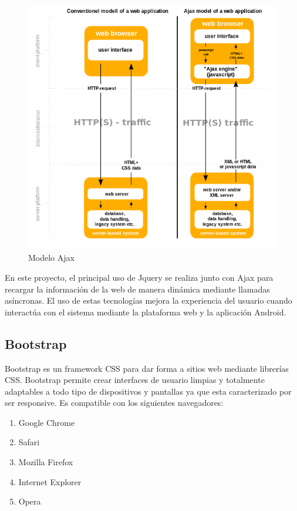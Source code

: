 \documentclass[a4paper,11pt]{book}
\begin{document}
\begin{figure}[H] 
\centering 
\includegraphics[scale=0.35]{imagenes/desarrollo_herramienta/ajax.png}
\caption{ Modelo Ajax\cite{aj2}  }  
\end{figure}   

En este proyecto, el principal uso de Jquery se realiza junto con Ajax para recargar la información de la web de manera dinámica mediante llamadas asíncronas. El uso de estas tecnologías mejora la experiencia del usuario cuando interactúa con el sistema mediante la plataforma web y la aplicación Android.


\subsection{Bootstrap}
Bootstrap\cite{boo} es un framework CSS para dar forma a sitios web mediante librerías CSS. Bootstrap  permite crear interfaces de usuario limpias y totalmente adaptables a todo tipo de dispositivos y pantallas ya que esta caracterizado por ser responsive. Es compatible con los siguientes navegadores: 

\begin{enumerate}
\item Google Chrome
\item Safari
\item Mozilla Firefox 
\item Internet Explorer 
\item Opera  
\end{enumerate}
\end{document}
